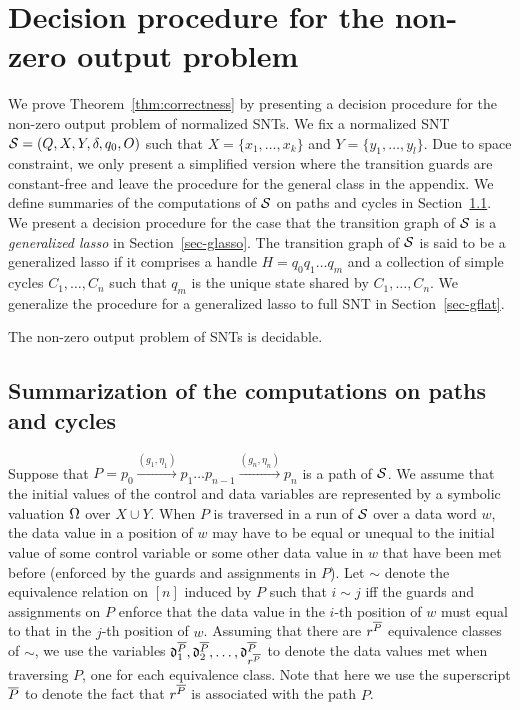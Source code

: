 
\section{Decision procedure for the non-zero output problem}\label{sec:dec-snt}
%
We prove Theorem~\ref{thm:correctness} by presenting a decision procedure for the non-zero output problem of normalized SNTs. We fix a normalized SNT ${\mathcal{S} } = (Q,X,Y,\delta,q_0,O)$ such that $X=\{ x_1,\dots, x_k\}$ and $Y = \{y_1,\dots,y_l\}$. Due to space constraint, we only present a simplified version where the transition guards are constant-free and leave the procedure for the general class in the appendix.
We define summaries of the computations of ${\mathcal{S} }$ on paths and cycles in Section~\ref{sec-sum}. We present a decision procedure for the case that the transition graph of ${\mathcal{S} }$ is a \emph{generalized lasso} in Section~\ref{sec-glasso}. The transition graph of ${\mathcal{S} }$ is said to be a generalized lasso if it comprises a handle $H=q_0 q_1 \dots q_m$ and a collection of simple cycles $C_1,\dots,C_n$ such that $q_m$ is the unique state shared by $C_1,\dots,C_n$. We generalize the procedure for a generalized lasso to full SNT in Section~\ref{sec-gflat}.

\begin{theorem}\label{thm:correctness}
The non-zero output problem of SNTs is decidable.
\end{theorem}



\subsection{Summarization of the computations on paths and cycles}\label{sec-sum}

Suppose that $P=p_0 \xrightarrow{(g_1,\eta_1)} p_1 \dots p_{n-1} \xrightarrow{(g_n,\eta_n)} p_{n}$ is a path of ${\mathcal{S} }$. We assume that the initial values of the control and data variables are represented by a symbolic valuation $\Omega$ over $X \cup Y$. When $P$ is traversed in a run of ${\mathcal{S} }$ over a data word $w$,  the data value in a position of $w$ may have to be equal or unequal to the initial value of some control variable or some other data value in $w$ that have been met before (enforced by the guards and assignments in $P$). Let $\sim$ denote the equivalence relation on $[n]$ induced by $P$ such that $i \sim j$ iff the guards and assignments on $P$ enforce that the data value in the $i$-th position of $w$ must equal to that in the $j$-th position of $w$. Assuming that there are $r^{\overline{P}}$ equivalence classes of $\sim$, we use the variables $\mathfrak{d}^{\overline{P}}_1,\mathfrak{d}^{\overline{P}}_2,\dots, \mathfrak{d}^{\overline{P}}_{r^{\overline{P}}}$ to denote the data values met when traversing $P$, one for each equivalence class. Note that here we use the superscript ${\overline{P}}$ to denote the fact that $r^{\overline{P}}$ is associated with the path $P$.

